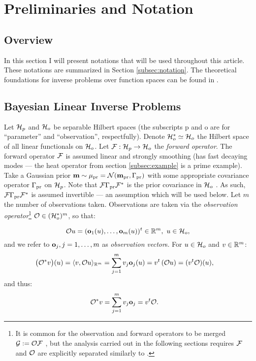 \section{Preliminaries and Notation}\label{section:prelim}

\subsection{Overview}
In this section I will present notations that will be used throughout
this article. These notations are summarized in Section
\ref{subsec:notation}. The theoretical foundations for inverse
problems over function spaces can be found in
\cite{Stuart10}.


\subsection{Bayesian Linear Inverse Problems}\label{subsec:abstract OED}
Let $\mathcal{H}_p$ and $\mathcal{H}_o$ be separable Hilbert spaces (the subscripts p
and o are for ``parameter'' and ``observation'', respectfully). Denote
$\mathcal{H}_o^* \simeq \mathcal{H}_o$ the Hilbert space of all linear functionals on
$\mathcal{H}_o$. Let $\mathcal{F}: \mathcal{H}_p \to \mathcal{H}_o$ the \emph{forward operator}. The
forward operator $\mathcal{F}$ is assumed linear and strongly smoothing (has
fast decaying modes --- the heat operator from section
\ref{subsec:example} is a prime example). Take a Gaussian prior
$\mathbf{m} \sim \mu_{\textup{pr}} = \mathcal{N}(\mathbf{m}_{\textup{pr}} ,\Gamma_{\textup{pr}})$ with some appropriate
covariance operator $\Gamma_{\textup{pr}}$ \cite{Stuart10} on $\mathcal{H}_p$. Note that
$\mathcal{F} \Gamma_{\textup{pr}} \mathcal{F}^*$ is the prior covariance in $\mathcal{H}_o$
\cite{Stuart10}. As such, $\mathcal{F} \Gamma_{\textup{pr}} \mathcal{F}^*$ is assumed invertible
--- an assumption which will be used below. Let $m$ the number of
observations taken. Observations are taken via the \emph{observation
operator}\footnote{It is common for the observation and forward
operators to be merged $\mathcal{G} := \mathcal{O} \mathcal{F}$
\cite{AlexanderianGloorGhattas14}, but the analysis carried out in the
following sections requires $\mathcal{F}$ and $\mathcal{O}$ are explicitly separated
similarly to \cite{attia2022stochastic, cvetkovic2023choosing}.} $\mathcal{O}
\in ( \mathcal{H}_o^* )^m$, so that:

\begin{equation*}%
  \obs u = (\meas_1(u), \dots, \meas_m(u) )^t \in \R^m,\ u \in \hilo,
\end{equation*}
%
%
and we refer to $\mathbf{o}_j, j=1,\dots,m$ as \emph{observation
vector}s. For $u \in \mathcal{H}_o$ and $v\in \mathbb{R}^m$:
%
%
\begin{align*}
  \big (\obs^*v \big ) (u) &= \langle v, \obs u \rangle_{\R^m} = \sum_{j=1}^m  v_j \meas_j(u)
  = v^t \left ( \obs u \right ) = (v^t \obs) (u),
\end{align*}
and thus:
\begin{align}\label{eq:obs*}
  \obs^*v &= \sum_{j=1}^m v_j \meas_j = v^t \obs.
\end{align}

